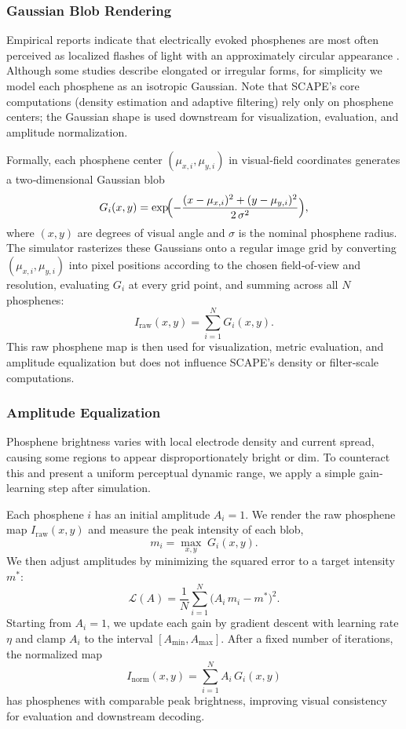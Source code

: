 \subsubsection{Gaussian Blob Rendering}
Empirical reports indicate that electrically evoked phosphenes are most often perceived as localized flashes of light with an approximately circular appearance \cite{vanderGrinten2024}. Although some studies describe elongated or irregular forms, for simplicity we model each phosphene as an isotropic Gaussian. Note that SCAPE’s core computations (density estimation and adaptive filtering) rely only on phosphene centers; the Gaussian shape is used downstream for visualization, evaluation, and amplitude normalization.

Formally, each phosphene center \((\mu_{x,i},\mu_{y,i})\) in visual‐field coordinates generates a two‐dimensional Gaussian blob
\[
G_i(x,y)
=
\exp\!\Bigl(-\frac{(x-\mu_{x,i})^2 + (y-\mu_{y,i})^2}{2\,\sigma^2}\Bigr),
\]
where \((x,y)\) are degrees of visual angle and \(\sigma\) is the nominal phosphene radius. The simulator rasterizes these Gaussians onto a regular image grid by converting \((\mu_{x,i},\mu_{y,i})\) into pixel positions according to the chosen field‐of‐view and resolution, evaluating \(G_i\) at every grid point, and summing across all \(N\) phosphenes:
\[
I_{\mathrm{raw}}(x,y)
=
\sum_{i=1}^{N} G_i(x,y).
\]
This raw phosphene map is then used for visualization, metric evaluation, and amplitude equalization but does not influence SCAPE’s density or filter‐scale computations.


\subsubsection{Amplitude Equalization}
Phosphene brightness varies with local electrode density and current spread, causing some regions to appear disproportionately bright or dim. To counteract this and present a uniform perceptual dynamic range, we apply a simple gain‐learning step after simulation.

Each phosphene \(i\) has an initial amplitude \(A_i=1\). We render the raw phosphene map \(I_{\mathrm{raw}}(x,y)\) and measure the peak intensity of each blob,
\[
m_i = \max_{x,y}\;G_i(x,y).
\]
We then adjust amplitudes by minimizing the squared error to a target intensity \(m^*\):
\[
\mathcal{L}(A) = \frac{1}{N}\sum_{i=1}^N \bigl(A_i\,m_i - m^*\bigr)^2.
\]
Starting from \(A_i=1\), we update each gain by gradient descent with learning rate \(\eta\) and clamp \(A_i\) to the interval \([A_{\min},A_{\max}]\). After a fixed number of iterations, the normalized map
\[
I_{\mathrm{norm}}(x,y)
=
\sum_{i=1}^N A_i\,G_i(x,y)
\]
has phosphenes with comparable peak brightness, improving visual consistency for evaluation and downstream decoding.  



